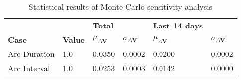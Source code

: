 \begin{table}[h!]
\centering
\begin{tabular}{llllll}
 &  & \cellcolor[HTML]{EFEFEF}\textbf{Total} &  & \cellcolor[HTML]{EFEFEF}\textbf{Last 14 days} &  \\
\rowcolor[HTML]{EFEFEF} 
\textbf{Case} & \textbf{Value} & \textbf{$\mu_{\Delta \boldsymbol{V}}$} & \textbf{$\sigma_{\Delta \boldsymbol{V}}$} & \textbf{$\mu_{\Delta \boldsymbol{V}}$} & \textbf{$\sigma_{\Delta \boldsymbol{V}}$} \\ 
Arc Duration & 1.0 & 0.0350 & 0.0002 & 0.0200 & 0.0002 \\ 
Arc Interval & 1.0 & 0.0253 & 0.0003 & 0.0142 & 0.0000 \\ 
\end{tabular}
\caption{Statistical results of Monte Carlo sensitivity analysis}
\label{tab:SensitivityAnalysis}
\end{table}